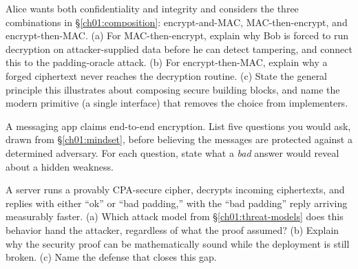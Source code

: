 \begin{exercise}
Alice wants both confidentiality and integrity and considers the three combinations in \S\ref{ch01:composition}: encrypt-and-MAC, MAC-then-encrypt, and encrypt-then-MAC.
(a) For MAC-then-encrypt, explain why Bob is forced to run decryption on attacker-supplied data before he can detect tampering, and connect this to the padding-oracle attack.
(b) For encrypt-then-MAC, explain why a forged ciphertext never reaches the decryption routine.
(c) State the general principle this illustrates about composing secure building blocks, and name the modern primitive (a single interface) that removes the choice from implementers.
\end{exercise}

\begin{exercise}
A messaging app claims end-to-end encryption. List five questions you would ask, drawn from \S\ref{ch01:mindset}, before believing the messages are protected against a determined adversary. For each question, state what a \emph{bad} answer would reveal about a hidden weakness.
\end{exercise}

\begin{exercise}
A server runs a provably CPA-secure cipher, decrypts incoming ciphertexts, and replies with either ``ok'' or ``bad padding,'' with the ``bad padding'' reply arriving measurably faster.
(a) Which attack model from \S\ref{ch01:threat-models} does this behavior hand the attacker, regardless of what the proof assumed?
(b) Explain why the security proof can be mathematically sound while the deployment is still broken.
(c) Name the defense that closes this gap.
\end{exercise}
